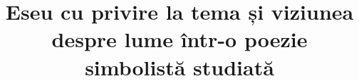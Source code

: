 

\title{Eseu cu privire la tema și viziunea despre lume într-o poezie simbolistă studiată}


 \maketitle %
 

